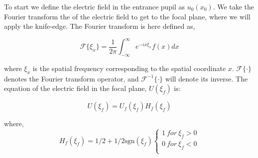 
To start we define the electric field in the entrance pupil as $u_0(x_0)$. We take the Fourier transform the of the electric field to get to the focal plane, where we will apply the knife-edge. The Fourier transform is here defined as,

\begin{equation}
    \mathcal{F}\{\xi_x\}=\frac{1}{2\pi}\int_{-\infty}^\infty e^{-i x \xi_x} f(x) dx
    \label{FourierT}
\end{equation}

where $\xi_x$ is the spatial frequency corresponding to the spatial coordinate $x$. $\mathcal{F}\{\cdot\}$ denotes the Fourier transform operator, and  $\mathcal{F}^{-1}\{\cdot\}$ will denote its inverse. The equation of the electric field in the focal plane, $U(\xi_f)$ is:

\begin{equation}
    U (\xi_f)=U_f(\xi_f)H_f(\xi_f)
    \label{FT}
\end{equation}

where,
\[ 
H_f(\xi_f)= 1/2+1/2\mbox{sgn}(\xi_f) \left\{
\begin{array}{ll}
      1 \: for \: \xi_f >0\\
      0 \: for \: \xi_f <0\\
      
\end{array} 
\right. 
\]

